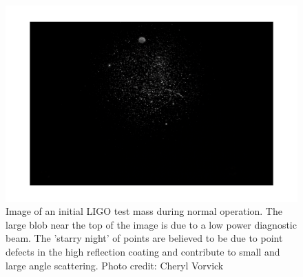 \begin{figure}[h]
  \centering
    \includegraphics[width=\columnwidth]{Figures/Cheryl-2ketmy.pdf}
    \caption[Point defects in a LIGO mirror]{Image of an initial LIGO 
      test mass during normal operation. The large blob near the top
      of the image is due to a low power diagnostic beam. The 
      'starry night' of points are believed to be due to point 
      defects in the high reflection coating and contribute to small 
      and large angle scattering. Photo credit: Cheryl Vorvick}
    \label{fig:2kETMy}
\end{figure}


